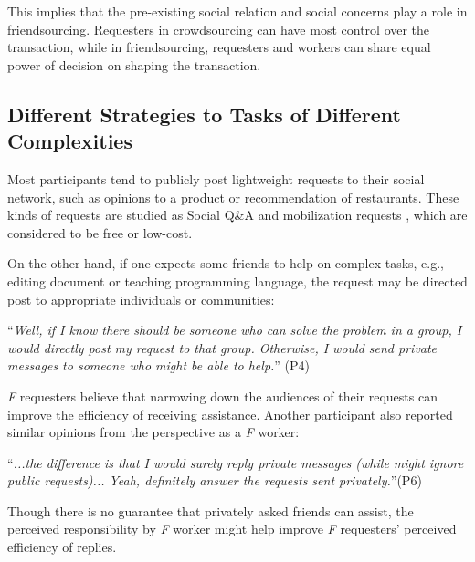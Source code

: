 This implies that the pre-existing social relation and social concerns play a role in friendsourcing. 
Requesters in crowdsourcing can have most control over the transaction, while in friendsourcing, 
requesters and workers can share equal power of decision on shaping the transaction. 


\subsection{Different Strategies to Tasks of Different Complexities}
Most participants tend to publicly post lightweight requests to their social network, 
such as opinions to a product or recommendation of restaurants.
These kinds of requests are studied as Social Q\&A \cite{Morris:CHI10:QABehavior} 
and mobilization requests \cite{Lampe:CSCW14:HelpOnWay}, which are considered to be free or low-cost.

On the other hand, if one expects some friends to help on complex tasks, 
e.g., editing document or teaching programming language, 
the request may be directed post to appropriate individuals or communities:

``\emph{Well, if I know there should be someone who can solve the problem in a group, 
I would directly post my request to that group. 
Otherwise, I would send private messages to someone who might be able to help.}'' (P4)

\emph{F} requesters believe that narrowing down the audiences of their requests can improve the efficiency of receiving assistance.
Another participant also reported similar opinions from the perspective as a \emph{F} worker:

``\emph{...the difference is that I would surely reply private messages (while might ignore public requests)...
Yeah, definitely answer the requests sent privately.}''(P6)

Though there is no guarantee that privately asked friends can assist, 
the perceived responsibility by \emph{F} worker might help improve \emph{F} requesters' perceived efficiency of replies.


